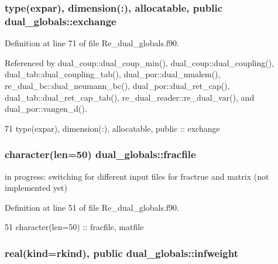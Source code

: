 \subsubsection[{exchange}]{\setlength{\rightskip}{0pt plus 5cm}type({\bf expar}), dimension(\+:), allocatable, public dual\+\_\+globals\+::exchange}\label{namespacedual__globals_a5407ebae154d8d337e3e527b1ee73129}


Definition at line 71 of file Re\+\_\+dual\+\_\+globals.\+f90.



Referenced by dual\+\_\+coup\+::dual\+\_\+coup\+\_\+min(), dual\+\_\+coup\+::dual\+\_\+coupling(), dual\+\_\+tab\+::dual\+\_\+coupling\+\_\+tab(), dual\+\_\+por\+::dual\+\_\+mualem(), re\+\_\+dual\+\_\+bc\+::dual\+\_\+neumann\+\_\+bc(), dual\+\_\+por\+::dual\+\_\+ret\+\_\+cap(), dual\+\_\+tab\+::dual\+\_\+ret\+\_\+cap\+\_\+tab(), re\+\_\+dual\+\_\+reader\+::re\+\_\+dual\+\_\+var(), and dual\+\_\+por\+::vangen\+\_\+d().


\begin{DoxyCode}
71   \textcolor{keywordtype}{type}(expar), \textcolor{keywordtype}{dimension(:)}, \textcolor{keywordtype}{allocatable}, \textcolor{keywordtype}{public} :: exchange
\end{DoxyCode}
\subsubsection[{fracfile}]{\setlength{\rightskip}{0pt plus 5cm}character(len=50) dual\+\_\+globals\+::fracfile}\label{namespacedual__globals_a0eba84c0036f30687cff4cef7415048e}


in progress\+: switching for different input files for fractrue and matrix (not implemented yet) 



Definition at line 51 of file Re\+\_\+dual\+\_\+globals.\+f90.


\begin{DoxyCode}
51   \textcolor{keywordtype}{character(len=50)} :: fracfile, matfile
\end{DoxyCode}
\subsubsection[{infweight}]{\setlength{\rightskip}{0pt plus 5cm}real(kind=rkind), public dual\+\_\+globals\+::infweight}\label{namespacedual__globals_ab091219954e9459555311e4f6311c3f9}


